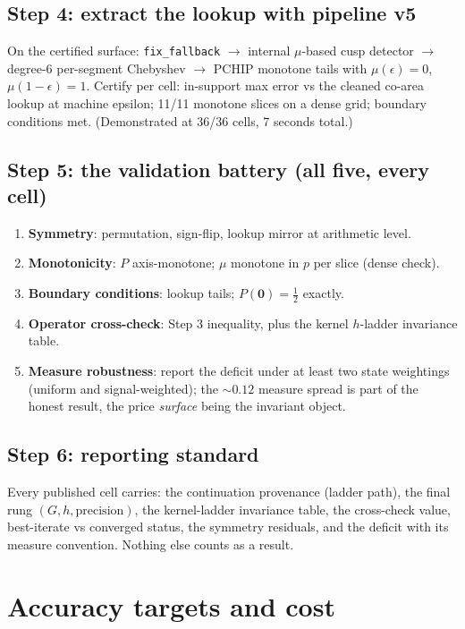\section{Step 4: extract the lookup with pipeline v5}
On the certified surface: \texttt{fix\_fallback} $\to$ internal
$\mu$-based cusp detector $\to$ degree-6 per-segment Chebyshev $\to$
PCHIP monotone tails with $\mu(\epsilon) = 0$, $\mu(1-\epsilon) = 1$.
Certify per cell: in-support max error vs the cleaned co-area lookup at
machine epsilon; 11/11 monotone slices on a dense grid; boundary
conditions met. (Demonstrated at 36/36 cells, 7 seconds total.)

\section{Step 5: the validation battery (all five, every cell)}
\begin{enumerate}\itemsep2pt
  \item \textbf{Symmetry}: permutation, sign-flip, lookup mirror at
        arithmetic level.
  \item \textbf{Monotonicity}: $P$ axis-monotone; $\mu$ monotone in $p$
        per slice (dense check).
  \item \textbf{Boundary conditions}: lookup tails; $P(\mathbf{0}) =
        \tfrac12$ exactly.
  \item \textbf{Operator cross-check}: Step 3 inequality, plus the
        kernel $h$-ladder invariance table.
  \item \textbf{Measure robustness}: report the deficit under at least
        two state weightings (uniform and signal-weighted); the
        $\sim 0.12$ measure spread is part of the honest result, the
        price \emph{surface} being the invariant object.
\end{enumerate}

\section{Step 6: reporting standard}
Every published cell carries: the continuation provenance (ladder
path), the final rung $(G, h, \text{precision})$, the kernel-ladder
invariance table, the \strict{} cross-check value, best-iterate vs
converged status, the symmetry residuals, and the deficit with its
measure convention. Nothing else counts as a result.

\chapter{Accuracy targets and cost}

